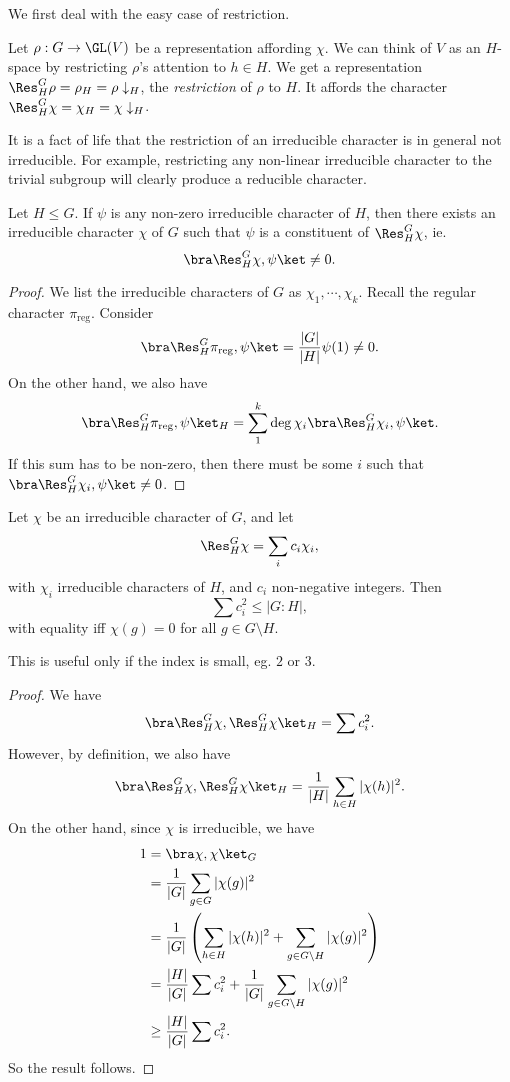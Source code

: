 \documentclass[a4paper]{article}
\begin{document}
We first deal with the easy case of restriction.
\begin{defi}[Restriction]
  Let $\rho: G \to \GL(V)$ be a representation affording $\chi$. We can think of $V$ as an $H$-space by restricting $\rho$'s attention to $h \in H$. We get a representation $\Res^G_H \rho = \rho_H = \rho\downarrow_H$, the \emph{restriction} of $\rho$ to $H$. It affords the character $\Res^G_H \chi = \chi_H = \chi\downarrow_H$.
\end{defi}
It is a fact of life that the restriction of an irreducible character is in general not irreducible. For example, restricting any non-linear irreducible character to the trivial subgroup will clearly produce a reducible character.

\begin{lemma}
  Let $H \leq G$. If $\psi$ is any non-zero irreducible character of $H$, then there exists an irreducible character $\chi$ of $G$ such that $\psi$ is a constituent of $\Res_H^G \chi$, ie.
  \[
    \bra \Res^G_H \chi, \psi \ket \not= 0.
  \]
\end{lemma}

\begin{proof}
  We list the irreducible characters of $G$ as $\chi_1, \cdots, \chi_k$. Recall the regular character $\pi_{\mathrm{reg}}$. Consider
  \[
    \bra \Res^G_H\pi_{\mathrm{reg}}, \psi\ket = \frac{|G|}{|H|} \psi(1) \not= 0.
  \]
  On the other hand, we also have
  \[
    \bra \Res^G_H\pi_{\mathrm{reg}}, \psi\ket_H = \sum_{1}^k \deg \chi_i \bra \Res^G_H \chi_i, \psi\ket.
  \]
  If this sum has to be non-zero, then there must be some $i$ such that $\bra \Res^G_H \chi_i, \psi\ket \not= 0$.
\end{proof}

\begin{lemma}
  Let $\chi$ be an irreducible character of $G$, and let
  \[
    \Res^G_H \chi = \sum_i c_i \chi_i,
  \]
  with $\chi_i$ irreducible characters of $H$, and $c_i$ non-negative integers. Then
  \[
    \sum c_i^2 \leq |G:H|,
  \]
  with equality iff $\chi(g) = 0$ for all $g \in G\setminus H$.
\end{lemma}
This is useful only if the index is small, eg. $2$ or $3$.
\begin{proof}
  We have
  \[
    \bra \Res^G_H \chi, \Res^G_H \chi\ket_H = \sum c_i^2.
  \]
  However, by definition, we also have
  \[
    \bra \Res^G_H \chi, \Res^G_H \chi\ket_H = \frac{1}{|H|}\sum_{h \in H} |\chi(h)|^2.
  \]
  On the other hand, since $\chi$ is irreducible, we have
  \begin{align*}
    1 &= \bra \chi, \chi\ket_G\\
    &= \frac{1}{|G|}\sum_{g \in G} |\chi(g)|^2 \\
    &= \frac{1}{|G|} \left(\sum_{h \in H} |\chi(h)|^2 + \sum_{g \in G\setminus H} |\chi(g)|^2\right)\\
    &= \frac{|H|}{|G|} \sum c_i^2 + \frac{1}{|G|} \sum_{g \in G \setminus H} |\chi(g)|^2\\
    &\geq \frac{|H|}{|G|} \sum c_i^2.
  \end{align*}
  So the result follows.
\end{proof}
\end{document}
